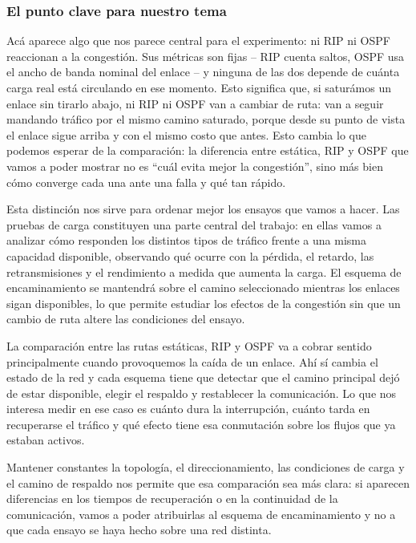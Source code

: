 \documentclass[11pt,a4paper]{article}
\begin{document}
\subsubsection*{El punto clave para nuestro tema}

Ac\'a aparece algo que nos parece central para el experimento: ni RIP ni OSPF reaccionan a la congesti\'on. Sus m\'etricas son fijas -- RIP cuenta saltos, OSPF usa el ancho de banda nominal del enlace -- y ninguna de las dos depende de cu\'anta carga real est\'a circulando en ese momento. Esto significa que, si satur\'amos un enlace sin tirarlo abajo, ni RIP ni OSPF van a cambiar de ruta: van a seguir mandando tr\'afico por el mismo camino saturado, porque desde su punto de vista el enlace sigue arriba y con el mismo costo que antes. Esto cambia lo que podemos esperar de la comparaci\'on: la diferencia entre est\'atica, RIP y OSPF que vamos a poder mostrar no es ``cu\'al evita mejor la congesti\'on'', sino m\'as bien c\'omo converge cada una ante una falla y qu\'e tan r\'apido.

Esta distinci\'on nos sirve para ordenar mejor los ensayos que vamos a hacer. Las pruebas de carga constituyen una parte central del trabajo: en ellas vamos a analizar c\'omo responden los distintos tipos de tr\'afico frente a una misma capacidad disponible, observando qu\'e ocurre con la p\'erdida, el retardo, las retransmisiones y el rendimiento a medida que aumenta la carga. El esquema de encaminamiento se mantendr\'a sobre el camino seleccionado mientras los enlaces sigan disponibles, lo que permite estudiar los efectos de la congesti\'on sin que un cambio de ruta altere las condiciones del ensayo.

La comparaci\'on entre las rutas est\'aticas, RIP y OSPF va a cobrar sentido principalmente cuando provoquemos la ca\'ida de un enlace. Ah\'i s\'i cambia el estado de la red y cada esquema tiene que detectar que el camino principal dej\'o de estar disponible, elegir el respaldo y restablecer la comunicaci\'on. Lo que nos interesa medir en ese caso es cu\'anto dura la interrupci\'on, cu\'anto tarda en recuperarse el tr\'afico y qu\'e efecto tiene esa conmutaci\'on sobre los flujos que ya estaban activos.

Mantener constantes la topolog\'ia, el direccionamiento, las condiciones de carga y el camino de respaldo nos permite que esa comparaci\'on sea m\'as clara: si aparecen diferencias en los tiempos de recuperaci\'on o en la continuidad de la comunicaci\'on, vamos a poder atribuirlas al esquema de encaminamiento y no a que cada ensayo se haya hecho sobre una red distinta.
\end{document}
